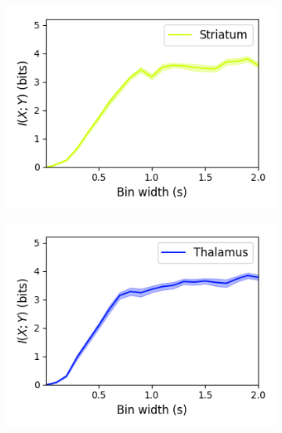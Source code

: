 \documentclass[a4paper,12pt]{article}
\theoremstyle{definition}
\begin{document}
\begin{figure}[p]
\begin{subfigure}{0.5\textwidth}
    \includegraphics[width=\textwidth]{figures/linear_mutual_info_by_bin_width_striatum_14.png}
  \end{subfigure}
  \begin{subfigure}{0.5\textwidth}
    \centering
    \includegraphics[width=\textwidth]{figures/linear_mutual_info_by_bin_width_thalamus_15.png}
  \end{subfigure}
  \begin{subfigure}{0.5\textwidth}
    \centering

\end{subfigure}
\end{figure}
\end{document}
